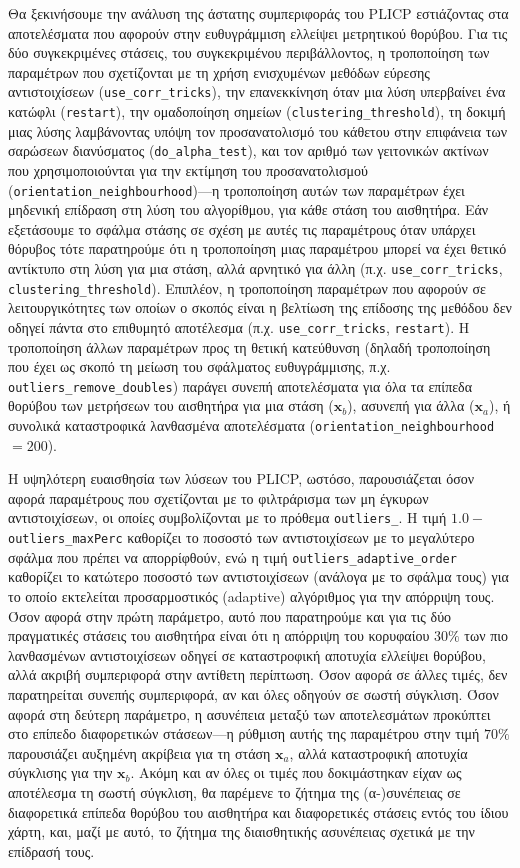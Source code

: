 Θα ξεκινήσουμε την ανάλυση της άστατης συμπεριφοράς του PLICP εστιάζοντας στα
αποτελέσματα που αφορούν στην ευθυγράμμιση ελλείψει μετρητικού θορύβου. Για τις
δύο συγκεκριμένες στάσεις, του συγκεκριμένου περιβάλλοντος, η τροποποίηση των
παραμέτρων που σχετίζονται με τη χρήση ενισχυμένων μεθόδων εύρεσης
αντιστοιχίσεων (\texttt{use\_corr\_tricks}), την επανεκκίνηση όταν μια λύση
υπερβαίνει ένα κατώφλι (\texttt{restart}), την ομαδοποίηση σημείων
(\texttt{clustering\_threshold}), τη δοκιμή μιας λύσης λαμβάνοντας υπόψη τον
προσανατολισμό του κάθετου στην επιφάνεια των σαρώσεων διανύσματος
(\texttt{do\_alpha\_test}), και τον αριθμό των γειτονικών ακτίνων που
χρησιμοποιούνται για την εκτίμηση του προσανατολισμού
(\texttt{orientation\_neighbourhood})---η τροποποίηση αυτών των παραμέτρων
έχει μηδενική επίδραση στη λύση του αλγορίθμου, για κάθε στάση του
αισθητήρα. Εάν εξετάσουμε το σφάλμα στάσης σε σχέση με αυτές τις παραμέτρους
όταν υπάρχει θόρυβος τότε παρατηρούμε ότι η τροποποίηση μιας παραμέτρου μπορεί
να έχει θετικό αντίκτυπο στη λύση για μια στάση, αλλά αρνητικό για άλλη
(π.χ. \texttt{use\_corr\_tricks}, \texttt{clustering\_threshold}). Επιπλέον, η
τροποποίηση παραμέτρων που αφορούν σε λειτουργικότητες των οποίων ο σκοπός
είναι η βελτίωση της επίδοσης της μεθόδου δεν οδηγεί πάντα στο επιθυμητό
αποτέλεσμα (π.χ. \texttt{use\_corr\_tricks}, \texttt{restart}). Η τροποποίηση
άλλων παραμέτρων προς τη θετική κατεύθυνση (δηλαδή τροποποίηση που έχει ως
σκοπό τη μείωση του σφάλματος ευθυγράμμισης, π.χ.
\texttt{outliers\_remove\_doubles}) παράγει συνεπή αποτελέσματα για όλα τα
επίπεδα θορύβου των μετρήσεων του αισθητήρα για μια στάση ($\bm{x}_b$), ασυνεπή
για άλλα ($\bm{x}_a$), ή συνολικά καταστροφικά λανθασμένα αποτελέσματα
(\texttt{orientation\_neighbourhood} $=200$).

Η υψηλότερη ευαισθησία των λύσεων του PLICP, ωστόσο, παρουσιάζεται όσον αφορά
παραμέτρους που σχετίζονται με το φιλτράρισμα των μη έγκυρων αντιστοιχίσεων, οι
οποίες συμβολίζονται με το πρόθεμα \texttt{outliers\_}. Η τιμή
$1.0-$\texttt{outliers\_maxPerc} καθορίζει το ποσοστό των αντιστοιχίσεων με το
μεγαλύτερο σφάλμα που πρέπει να απορρίφθούν, ενώ η τιμή
\texttt{outliers\_adaptive\_order} καθορίζει το κατώτερο ποσοστό των
αντιστοιχίσεων (ανάλογα με το σφάλμα τους) για το οποίο εκτελείται
προσαρμοστικός (adaptive) αλγόριθμος για την απόρριψη τους. Όσον αφορά στην
πρώτη παράμετρο, αυτό που παρατηρούμε και για τις δύο πραγματικές στάσεις του
αισθητήρα είναι ότι η απόρριψη του κορυφαίου $30\%$ των πιο λανθασμένων
αντιστοιχίσεων οδηγεί σε καταστροφική αποτυχία ελλείψει θορύβου, αλλά ακριβή
συμπεριφορά στην αντίθετη περίπτωση. Όσον αφορά σε άλλες τιμές, δεν
παρατηρείται συνεπής συμπεριφορά, αν και όλες οδηγούν σε σωστή σύγκλιση. Όσον
αφορά στη δεύτερη παράμετρο, η ασυνέπεια μεταξύ των αποτελεσμάτων προκύπτει στο
επίπεδο διαφορετικών στάσεων---η ρύθμιση αυτής της παραμέτρου στην τιμή $70\%$
παρουσιάζει αυξημένη ακρίβεια για τη στάση $\bm{x}_a$, αλλά καταστροφική
αποτυχία σύγκλισης για την $\bm{x}_b$. Ακόμη και αν όλες οι τιμές που
δοκιμάστηκαν είχαν ως αποτέλεσμα τη σωστή σύγκλιση, θα παρέμενε το ζήτημα της
(α-)συνέπειας σε διαφορετικά επίπεδα θορύβου του αισθητήρα και διαφορετικές
στάσεις εντός του ίδιου χάρτη, και, μαζί με αυτό, το ζήτημα της διαισθητικής
ασυνέπειας σχετικά με την επίδρασή τους.

